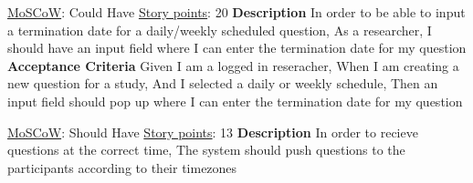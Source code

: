 \documentclass[12pt, a4paper]{report}
\begin{document}
\vspace*{20px}

\begin{tcolorbox}[width=\textwidth,colback={White},title={\textbf {Adding termination date for scheduled questions}},colbacktitle=grey,coltitle=black]
\underline{MoSCoW}: Could Have 
\hfill
\underline {Story points}: 20
\newline
\newline
\blindtext \textbf{Description}
\newline
In order to be able to input a termination date for a daily/weekly scheduled question, \newline
As a researcher, \newline
I should have an input field where I can enter the termination date for my question 
\newline
\newline
 \textbf{Acceptance Criteria}
 \newline
Given I am a logged in reseracher, \newline
When I am creating a new question for a study, \newline
And I selected a daily or weekly schedule, \newline
Then an input field should pop up where I can enter the termination date for my question 
\newline
\end{tcolorbox}  

\vspace*{20px}

\begin{tcolorbox}[width=\textwidth,colback={White},title={\textbf {Participant Time Zones}},colbacktitle=grey,coltitle=black]
\underline{MoSCoW}: Should Have
\hfill
\underline {Story points}: 13
\newline
\newline
\blindtext \textbf{Description}
\newline
In order to recieve questions at the correct time,\newline
The system should push questions to the participants according to their timezones
\newline
\end{tcolorbox}  

\vspace*{20px}
\end{document}
